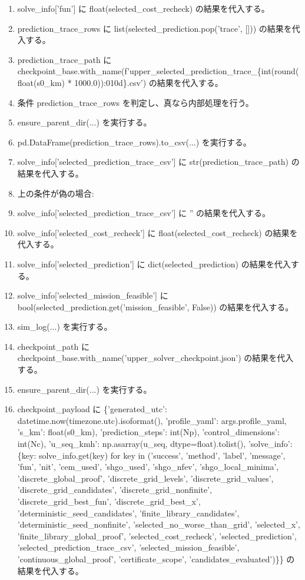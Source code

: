 \documentclass[a4paper,11pt]{article}
\begin{document}
\begin{enumerate}[leftmargin=1.8em]
\item   solve\_info['fun'] に float(selected\_cost\_recheck) の結果を代入する。
\item prediction\_trace\_rows に list(selected\_prediction.pop('trace', [])) の結果を代入する。
\item prediction\_trace\_path に checkpoint\_base.with\_name(f'upper\_selected\_prediction\_trace\_\{int(round(float(s0\_km) * 1000.0)):010d\}.csv') の結果を代入する。
\item 条件 prediction\_trace\_rows を判定し、真なら内部処理を行う。
\item   ensure\_parent\_dir(...) を実行する。
\item   pd.DataFrame(prediction\_trace\_rows).to\_csv(...) を実行する。
\item   solve\_info['selected\_prediction\_trace\_csv'] に str(prediction\_trace\_path) の結果を代入する。
\item   上の条件が偽の場合:
\item   solve\_info['selected\_prediction\_trace\_csv'] に '' の結果を代入する。
\item solve\_info['selected\_cost\_recheck'] に float(selected\_cost\_recheck) の結果を代入する。
\item solve\_info['selected\_prediction'] に dict(selected\_prediction) の結果を代入する。
\item solve\_info['selected\_mission\_feasible'] に bool(selected\_prediction.get('mission\_feasible', False)) の結果を代入する。
\item sim\_log(...) を実行する。
\item checkpoint\_path に checkpoint\_base.with\_name('upper\_solver\_checkpoint.json') の結果を代入する。
\item ensure\_parent\_dir(...) を実行する。
\item checkpoint\_payload に \{'generated\_utc': datetime.now(timezone.utc).isoformat(), 'profile\_yaml': args.profile\_yaml, 's\_km': float(s0\_km), 'prediction\_steps': int(Np), 'control\_dimensions': int(Nc), 'u\_seq\_kmh': np.asarray(u\_seq, dtype=float).tolist(), 'solve\_info': \{key: solve\_info.get(key) for key in ('success', 'method', 'label', 'message', 'fun', 'nit', 'cem\_used', 'shgo\_used', 'shgo\_nfev', 'shgo\_local\_minima', 'discrete\_global\_proof', 'discrete\_grid\_levels', 'discrete\_grid\_values', 'discrete\_grid\_candidates', 'discrete\_grid\_nonfinite', 'discrete\_grid\_best\_fun', 'discrete\_grid\_best\_x', 'deterministic\_seed\_candidates', 'finite\_library\_candidates', 'deterministic\_seed\_nonfinite', 'selected\_no\_worse\_than\_grid', 'selected\_x', 'finite\_library\_global\_proof', 'selected\_cost\_recheck', 'selected\_prediction', 'selected\_prediction\_trace\_csv', 'selected\_mission\_feasible', 'continuous\_global\_proof', 'certificate\_scope', 'candidates\_evaluated')\}\} の結果を代入する。

\end{enumerate}
\end{document}
